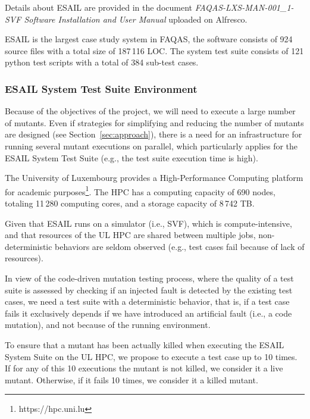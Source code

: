 Details about ESAIL are provided in the document \emph{FAQAS-LXS-MAN-001\_1- SVF Software Installation and User Manual} uploaded on Alfresco.

ESAIL is the largest case study system in FAQAS, the software consists of 924 source files with a total size of 187\,116 LOC. The system test suite consists of 121 python test scripts with a total of 384 sub-test cases. 

\subsubsection{ESAIL System Test Suite Environment}

Because of the objectives of the project, we will need to execute a large number of mutants. Even if strategies for simplifying and reducing the number of mutants are designed (see Section~\ref{sec:approach}), there is a need for an infrastructure for running several mutant executions on parallel, which particularly applies for the ESAIL System Test Suite (e.g., the test suite execution time is high).

The University of Luxembourg provides a High-Performance Computing platform for academic purposes\footnote{https://hpc.uni.lu}.
The HPC has a computing capacity of 690 nodes, totaling 11\,280 computing cores, and a storage capacity of 8\,742 TB.

Given that ESAIL runs on a simulator (i.e., SVF), which is compute-intensive, and that resources of the UL HPC are shared between multiple jobs, non-deterministic behaviors are seldom observed (e.g., test cases fail because of lack of resources).

In view of the code-driven mutation testing process, where the quality of a test suite is assessed by checking if an injected fault is detected by the existing test cases, we need a test suite with a deterministic behavior, that is, if a test case fails it exclusively depends if we have introduced an artificial fault (i.e., a code mutation), and not because of the running environment.

To ensure that a mutant has been actually killed when executing the ESAIL System Suite on the UL HPC, we propose to execute a test case up to 10 times. If for any of this 10 executions the mutant is not killed, we consider it a live mutant. Otherwise, if it fails 10 times, we consider it a killed mutant.



